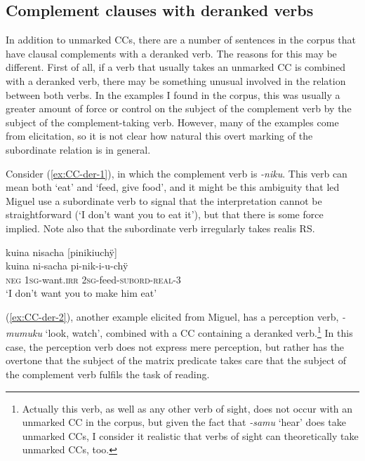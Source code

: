 
\subsection{Complement clauses with deranked verbs}\label{sec:CCs_deranked}

In addition to unmarked CCs, there are a number of sentences in the corpus that have clausal complements with a deranked verb. The reasons for this may be different. First of all, if a verb that usually takes an unmarked CC is combined with a deranked verb, there may be something unusual involved in the relation between both verbs. In the examples I found in the corpus, this was usually a greater amount of force or control on the subject of the complement verb by the subject of the complement-taking verb. However, many of the examples come from elicitation, so it is not clear how natural this overt marking of the subordinate relation is in general.

Consider (\ref{ex:CC-der-1}), in which the complement verb is \textit{-niku}. This verb can mean both ‘eat’ and ‘feed, give food’, and it might be this ambiguity that led Miguel use a subordinate verb to signal that the interpretation cannot be straightforward (‘I don’t want you to eat it’), but that there is some force implied. Note also that the subordinate verb irregularly takes realis RS.

\ea\label{ex:CC-der-1}
\begingl
\glpreamble kuina nisacha \textup{[}pinikiuchÿ\textup{]}\\
\gla kuina ni-sacha pi-nik-i-u-chÿ\\
\glb \textsc{neg} 1\textsc{sg}-want.\textsc{irr} 2\textsc{sg}-feed-\textsc{subord}-\textsc{real}-3\\
\glft ‘I don’t want you to make him eat’
\endgl
\trailingcitation{[mxx-e090728s-3.007]}
\xe


(\ref{ex:CC-der-2}), another example elicited from Miguel, has a perception verb, \textit{-mumuku} ‘look, watch’, combined with a CC containing a deranked verb.\footnote{Actually this verb, as well as any other verb of sight, does not occur with an unmarked CC in the corpus, but given the fact that \textit{-samu} ‘hear’ does take unmarked CCs, I consider it realistic that verbs of sight can theoretically take unmarked CCs, too.} In this case, the perception verb does not express mere perception, but rather has the overtone that the subject of the matrix predicate takes care that the subject of the complement verb fulfils the task of reading.

